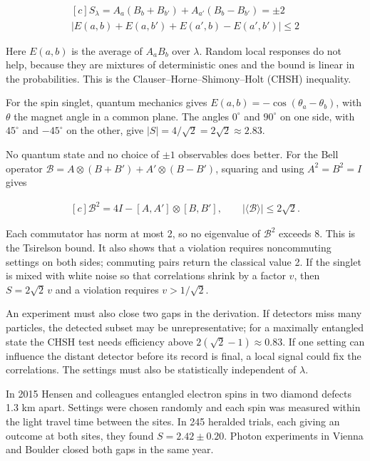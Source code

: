 \documentclass[11pt,oneside]{book}
\newenvironment{centeredalign}{\[\begin{gathered}[c]}{\end{gathered}\]}
\begin{document}
\begin{centeredalign}
S_\lambda=A_a(B_b+B_{b'})+A_{a'}(B_b-B_{b'})=\pm2\\
|E(a,b)+E(a,b')+E(a',b)-E(a',b')|\leq2
\end{centeredalign}

Here \(E(a,b)\) is the average of \(A_aB_b\) over \(\lambda\). Random local responses do not help, because they are mixtures of deterministic ones and the bound is linear in the probabilities. This is the Clauser--Horne--Shimony--Holt (CHSH) inequality.

For the spin singlet, quantum mechanics gives \(E(a,b)=-\cos(\theta_a-\theta_b)\), with \(\theta\) the magnet angle in a common plane. The angles \(0^\circ\) and \(90^\circ\) on one side, with \(45^\circ\) and \(-45^\circ\) on the other, give \(|S|=4/\sqrt2=2\sqrt2\approx2.83\).

No quantum state and no choice of \(\pm1\) observables does better. For the Bell operator \(\mathcal B=A\otimes(B+B')+A'\otimes(B-B')\), squaring and using \(A^2=B^2=I\) gives

\begin{centeredalign}
\mathcal B^2=4I-[A,A']\otimes[B,B'],\qquad
|\langle\mathcal B\rangle|\leq2\sqrt2.
\end{centeredalign}

Each commutator has norm at most 2, so no eigenvalue of \(\mathcal B^2\) exceeds 8. This is the Tsirelson bound. It also shows that a violation requires noncommuting settings on both sides; commuting pairs return the classical value 2. If the singlet is mixed with white noise so that correlations shrink by a factor \(v\), then \(S=2\sqrt2\,v\) and a violation requires \(v>1/\sqrt2\).

An experiment must also close two gaps in the derivation. If detectors miss many particles, the detected subset may be unrepresentative; for a maximally entangled state the CHSH test needs efficiency above \(2(\sqrt2-1)\approx0.83\). If one setting can influence the distant detector before its record is final, a local signal could fix the correlations. The settings must also be statistically independent of \(\lambda\).

In 2015 Hensen and colleagues entangled electron spins in two diamond defects 1.3 km apart. Settings were chosen randomly and each spin was measured within the light travel time between the sites. In 245 heralded trials, each giving an outcome at both sites, they found \(S=2.42\pm0.20\). Photon experiments in Vienna and Boulder closed both gaps in the same year.
\end{document}
